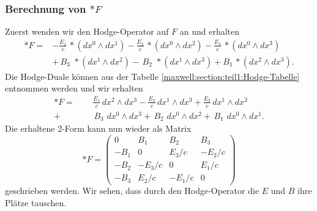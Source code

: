 \subsubsection{Berechnung von $\ast F$}
Zuerst wenden wir den Hodge-Operator auf $F$ an und erhalten
\begin{align*}
	\ast F =
	& - \frac{E_{1}}{c} \, {\ast}(dx^0 \wedge dx^1) - \frac{E_{2}}{c} \, {\ast}(dx^0 \wedge dx^2) - \frac{E_{3}}{c} \, {\ast}(dx^0 \wedge dx^3) \\
	& + \, B_3 \, \, {\ast}(dx^1 \wedge dx^2) - \, B_2 \, \, {\ast}(dx^1 \wedge dx^3) + B_1 \, {\ast}(dx^2 \wedge dx^3).
\end{align*}
Die Hodge-Duale können aus der Tabelle \ref{maxwell:section:teil1:Hodge-Tabelle} entnommen werden und wir erhalten
\begin{align*}
	\ast F =
	\phantom{+} & \frac{E_{1}}{c} \, dx^2 \wedge dx^3 - \frac{E_{2}}{c} \, dx^1 \wedge dx^3 + \frac{E_{3}}{c} \, dx^1 \wedge dx^2 \\
	 + & \, B_3 \, \, dx^0 \wedge dx^3 + \, B_2 \, \, dx^0 \wedge dx^2 + \, B_1 \, \, dx^0 \wedge dx^1.
\end{align*}
Die erhaltene 2-Form kann nun wieder als Matrix
\begin{equation}
	\ast F = \begin{pmatrix}
		0 & B_1 & B_2 & B_3 \\ -B_1 & 0 & E_3/c & -E_2/c \\ -B_2 & -E_3/c & 0 & E_1/c \\ -B_3 & E_2/c & -E_1/c & 0 
	\end{pmatrix}
\end{equation}
geschrieben werden.
Wir sehen, dass durch den Hodge-Operator die $E$ und $B$ ihre Plätze tauschen.
